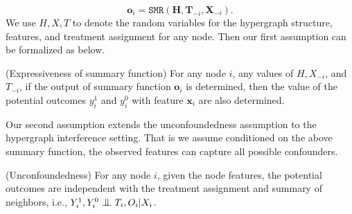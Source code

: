 \begin{equation}
      \mathbf{o}_i = \mathtt{SMR}(\mathbf{H}, \mathbf{T}_{-i}, \mathbf{X}_{-i}).
  \end{equation}
We use $H,X,T$ to denote the random variables for the hypergraph structure, features, and treatment assignment for any node. 
Then our first assumption can be formalized as below.
\begin{assumption}
(Expressiveness of summary function) 
For any node $i$, any values of $H, {X}_{-i}$, and ${T}_{-i}$, if the output of summary function $\mathbf{o}_i$ is determined, then the value of the potential outcomes $y_i^{1}$ and $y_i^{0}$ with feature $\mathbf{x}_i$ are also determined. 
\label{assumption:summary}
\end{assumption}

Our second assumption extends the unconfoundedness assumption \cite{rubin1980randomization} to the hypergraph interference setting. That is we assume conditioned on the above summary function, the observed features can capture all possible confounders.
\begin{assumption}
(Unconfoundedness) For any node $i$, given the node features, the potential outcomes are independent with the treatment assignment and summary of neighbors, i.e., $Y_i^1,Y_i^0 \bigCI T_i, O_i | {X}_i$. \label{assumption:unconfoundeness}
\end{assumption}

